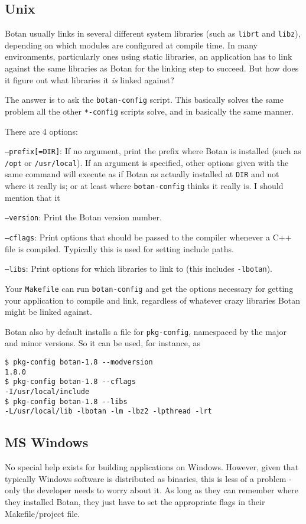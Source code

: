 \documentclass{article}
\newcommand{\filename}[1]{\texttt{#1}}
\begin{document}
\subsection{Unix}

Botan usually links in several different system libraries (such as
\texttt{librt} and \texttt{libz}), depending on which modules are
configured at compile time. In many environments, particularly ones
using static libraries, an application has to link against the same
libraries as Botan for the linking step to succeed. But how does it
figure out what libraries it \emph{is} linked against?

The answer is to ask the \filename{botan-config} script. This
basically solves the same problem all the other \filename{*-config}
scripts solve, and in basically the same manner.

There are 4 options:

\texttt{--prefix[=DIR]}: If no argument, print the prefix where Botan
is installed (such as \filename{/opt} or \filename{/usr/local}). If an
argument is specified, other options given with the same command will
execute as if Botan as actually installed at \filename{DIR} and not
where it really is; or at least where \filename{botan-config} thinks
it really is. I should mention that it

\texttt{--version}: Print the Botan version number.

\texttt{--cflags}: Print options that should be passed to the compiler
whenever a C++ file is compiled. Typically this is used for setting
include paths.

\texttt{--libs}: Print options for which libraries to link to (this includes
\texttt{-lbotan}).

Your \filename{Makefile} can run \filename{botan-config} and get the
options necessary for getting your application to compile and link,
regardless of whatever crazy libraries Botan might be linked against.

Botan also by default installs a file for \texttt{pkg-config},
namespaced by the major and minor versions. So it can be used,
for instance, as

\begin{verbatim}
$ pkg-config botan-1.8 --modversion
1.8.0
$ pkg-config botan-1.8 --cflags
-I/usr/local/include
$ pkg-config botan-1.8 --libs
-L/usr/local/lib -lbotan -lm -lbz2 -lpthread -lrt
\end{verbatim}

\subsection{MS Windows}

No special help exists for building applications on Windows. However,
given that typically Windows software is distributed as binaries, this
is less of a problem - only the developer needs to worry about it. As
long as they can remember where they installed Botan, they just have
to set the appropriate flags in their Makefile/project file.
\end{document}
